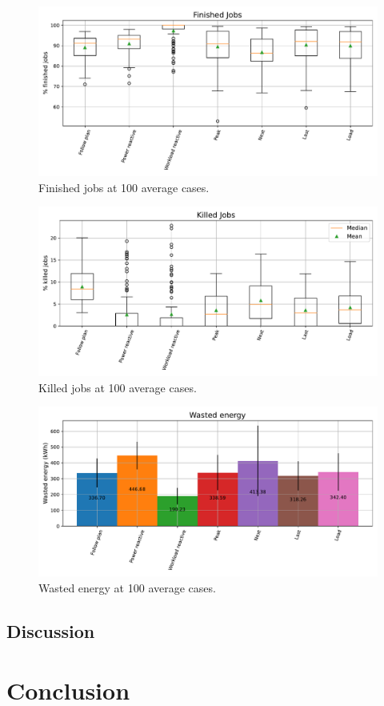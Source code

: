 \begin{figure}[!htb]
    \centering
    \includegraphics[scale=0.55]{Images/Compensations/finished_diff.pdf}
    \caption{Finished jobs at 100 average cases.}
    \label{fig:finished_diff}
\end{figure}

\begin{figure}[!htb]
    \centering
    \includegraphics[scale=0.55]{Images/Compensations/killed_diff.pdf}
    \caption{Killed jobs at 100 average cases.}
    \label{fig:killed_diff}
\end{figure}

\begin{figure}[!htb]
    \centering
    \includegraphics[scale=0.55]{Images/Compensations/energy_diff.pdf}
    \caption{Wasted energy at 100 average cases.}
    \label{fig:energy_diff}
\end{figure}


\clearpage

\subsection{Discussion}

\section{Conclusion}